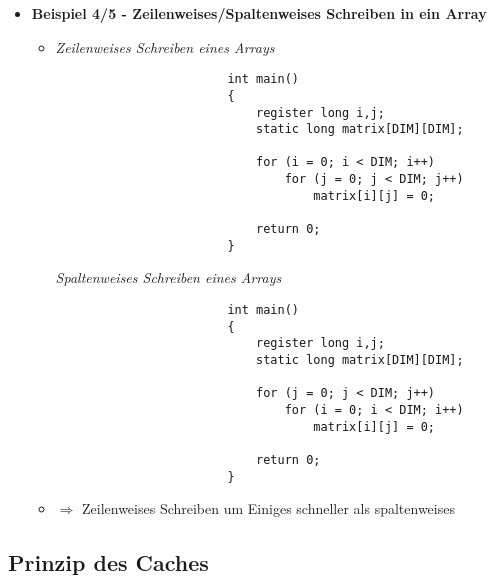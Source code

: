 \begin{itemize}
        \item \textbf{Beispiel 4/5 - Zeilenweises/Spaltenweises Schreiben in ein Array}
            \begin{itemize}
                \item[]
                    \begin{minipage}{0.45\textwidth}
                        \textit{Zeilenweises Schreiben eines Arrays}
                        \begin{verbatim}
                        int main()
                        {
                            register long i,j;
                            static long matrix[DIM][DIM];

                            for (i = 0; i < DIM; i++)
                                for (j = 0; j < DIM; j++)
                                    matrix[i][j] = 0;

                            return 0;
                        }
                        \end{verbatim}
                    \end{minipage}
                    \begin{minipage}{0.45\textwidth}
                        \textit{Spaltenweises Schreiben eines Arrays}
                        \begin{verbatim}
                        int main()
                        {
                            register long i,j;
                            static long matrix[DIM][DIM];

                            for (j = 0; j < DIM; j++)
                                for (i = 0; i < DIM; i++)
                                    matrix[i][j] = 0;

                            return 0;
                        }
                        \end{verbatim}
                    \end{minipage}
                \item[] $\Rightarrow$ Zeilenweises Schreiben um Einiges schneller als spaltenweises
            \end{itemize}

        
    \end{itemize}

\pagebreak

\subsection{Prinzip des Caches}

